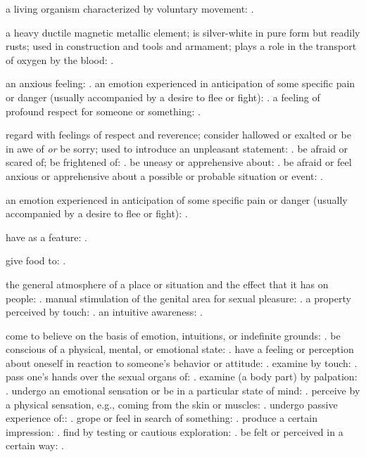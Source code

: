   a living organism characterized by voluntary movement: .

  a heavy ductile magnetic metallic element; is silver-white in pure form but readily rusts; used in construction and tools and armament; plays a role in the transport of oxygen by the blood: .

  an anxious feeling: . an emotion experienced in anticipation of some specific pain or danger (usually accompanied by a desire to flee or fight): . a feeling of profound respect for someone or something: .

  regard with feelings of respect and reverence; consider hallowed or exalted or be in awe of \textit{or} be sorry; used to introduce an unpleasant statement: . be afraid or scared of; be frightened of: . be uneasy or apprehensive about: . be afraid or feel anxious or apprehensive about a possible or probable situation or event: .

  an emotion experienced in anticipation of some specific pain or danger (usually accompanied by a desire to flee or fight): .

  have as a feature: .

  give food to: .

  the general atmosphere of a place or situation and the effect that it has on people: . manual stimulation of the genital area for sexual pleasure: . a property perceived by touch: . an intuitive awareness: .

  come to believe on the basis of emotion, intuitions, or indefinite grounds: . be conscious of a physical, mental, or emotional state: . have a feeling or perception about oneself in reaction to someone's behavior or attitude: . examine by touch: . pass one's hands over the sexual organs of: . examine (a body part) by palpation: . undergo an emotional sensation or be in a particular state of mind: . perceive by a physical sensation, e.g., coming from the skin or muscles: . undergo passive experience of:: . grope or feel in search of something: . produce a certain impression: . find by testing or cautious exploration: . be felt or perceived in a certain way: .

